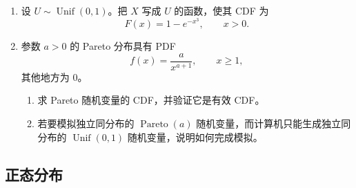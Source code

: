 \documentclass[UTF8, 12pt, fontset=fandol, oneside]{ctexart}
\begin{document}
\begin{enumerate}
  \item 设 $U\sim\operatorname{Unif}(0,1)$。把 $X$ 写成 $U$ 的函数，使其 CDF 为
  \[
    F(x)=1-e^{-x^3},\qquad x>0.
  \]

  \item 参数 $a>0$ 的 Pareto 分布具有 PDF
  \[
    f(x)=\frac{a}{x^{a+1}},\qquad x\ge1,
  \]
  其他地方为 $0$。
  \begin{enumerate}
    \item 求 Pareto 随机变量的 CDF，并验证它是有效 CDF。
    \item 若要模拟独立同分布的 $\operatorname{Pareto}(a)$ 随机变量，而计算机只能生成独立同分布的 $\operatorname{Unif}(0,1)$ 随机变量，说明如何完成模拟。
  \end{enumerate}
\end{enumerate}

\subsection*{正态分布}
\end{document}
